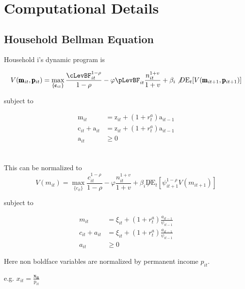 \documentclass[titlepage]{\econtex}\providecommand{\texname}{BufferStockTheory}
\begin{document}
\hypertarget{Computational Details}{}
\section{Computational Details}

\hypertarget{Household Bellman Equation }{}
\subsection{Household Bellman Equation}

Household i's dynamic program is

$$ V(\pmb{\mathrm{m}}_{it},\pmb{\mathrm{p}}_{it})=\max_{ \{ \pmb{\mathrm{c}}_{it}\}} { \frac{\cLevBF_{i t}^{1-\rho}}{1 -\rho} - \varphi \pLevBF_{it} \frac{n_{it}^{1+v}}{1+v} + \beta_{i} \not D \mathrm{E}_{t}[V( \pmb{\mathrm{m}}_{it+1} , \pmb{\mathrm{p}}_{it+1})]}$$

subject to 

\begin{align*}
 \pmb{\mathrm{m}}_{i t} & = \pmb{\mathrm{z}}_{i t}  + (1+\mathit{r}^{a}_{t})\pmb{\mathrm{a}}_{i t-1} \\
 \pmb{\mathrm{c}}_{i t}  + \pmb{\mathrm{a}}_{i t} &= \pmb{\mathrm{z}}_{i t}  + (1+\mathit{r}^{a}_{t}) \pmb{\mathrm{a}}_{i t-1}   \\
\pmb{\mathrm{a}}_{it} &\geq 0 
\end{align*} \\ \\

This can be normalized to \\


$$ V(m_{it}) = \max_{\{c_{it}\}} {  \frac{c_{i t}^{1-\rho}}{1 -\rho} - \varphi \frac{n_{it}^{1+v}}{1+v} + \beta_{i}\not D \mathrm{E}_{t}[\psi_{it+1}^{1-\rho} V(m_{it+1})]}$$

 subject to 
 
 \begin{align*}
m_{i t} &=  \xi_{it}  + (1+r^{a}_{t}) \frac{a_{i t-1}}{\psi_{it-1}} \\
 c_{i t}  + a_{i t} &= \xi_{it}  + (1+r^{a}_{t}) \frac{a_{i t-1}}{\psi_{it-1}} \\
 a_{it} &\geq 0 
 \end{align*}
 
 Here non boldface variables are normalized by permanent income $\mathit{p_{it}}$. 

e.g. $x_{it} = \frac{\mathbf{x_{it}}}{\pmb{\mathrm{p}}_{it}}$ \\
\end{document}
